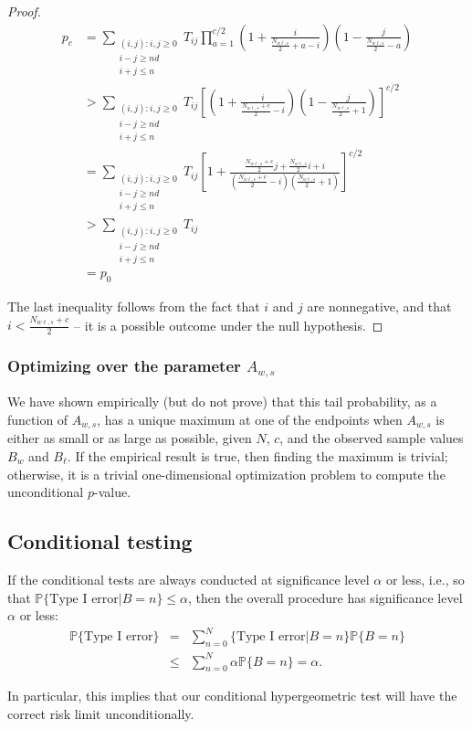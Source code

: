 \begin{proof}
\begin{align*}
p_c &= \sum_{\substack{(i, j) :  i, j\ge 0 \\ i-j \geq nd \\ i+j \leq n}}T_{ij} \prod_{a=1}^{c/2} \left(1 + \frac{i}{\frac{N_{w\ell,s}}{2} + a-i}\right)\left(1 - \frac{j}{\frac{N_{w\ell, s}}{2} - a}\right) \\
&> \sum_{\substack{(i, j) :  i, j\ge 0 \\ i-j \geq nd \\ i+j \leq n}} T_{ij} \left[ \left(1 + \frac{i}{\frac{N_{w\ell,s}+c}{2} -i}\right)\left(1 - \frac{j}{\frac{N_{w\ell, s}}{2}+1}\right) \right]^{c/2} \\
&= \sum_{\substack{(i, j) :  i, j\ge 0 \\ i-j \geq nd \\ i+j \leq n}} T_{ij} \left[ 1 + \frac{\frac{N_{w\ell,s}+c}{2}j + \frac{N_{w\ell,s}}{2}i + i}{(\frac{N_{w\ell,s}+c}{2}-i)(\frac{N_{w\ell,s}}{2}+1)}\right]^{c/2} \\
&> \sum_{\substack{(i, j) :  i, j\ge 0 \\ i-j \geq nd \\ i+j \leq n}} T_{ij}\\
&= p_0
\end{align*}

The last inequality follows from the fact that $i$ and $j$ are nonnegative, and 
that $i < \frac{N_{w\ell,s}+c}{2}$ -- it is a possible outcome under the null hypothesis.




\end{proof}


\subsubsection{Optimizing over the parameter $A_{w,s}$}

We have shown empirically (but do not prove) that this tail probability, as a function of $A_{w,s}$,
has a unique maximum at one of the endpoints when $A_{w,s}$ is either as small or as large as possible,
given $N$, $c$, and the observed sample values $B_w$ and $B_\ell$.
If the empirical result is true, then finding the maximum is trivial;
otherwise, it is a trivial one-dimensional optimization problem to compute the unconditional $p$-value.

\subsection{Conditional testing}
If the conditional tests are always conducted at significance level $\alpha$ or less, i.e., so that
$\mathbb{P} \{\mbox{Type I error} | B = n\} \le \alpha$, then the
overall procedure has significance level $\alpha$ or less:
\begin{eqnarray}
    \mathbb{P} \{\mbox{Type I error}\} &=& \sum_{n=0}^N \{\mbox{Type I error} |  B = n\} \mathbb{P} \{ B = n \} \nonumber \\
       & \le & \sum_{n=0}^N \alpha \mathbb{P} \{  B = n \}  =  \alpha.
\end{eqnarray}

In particular, this implies that our conditional hypergeometric test will have the correct risk limit unconditionally.
